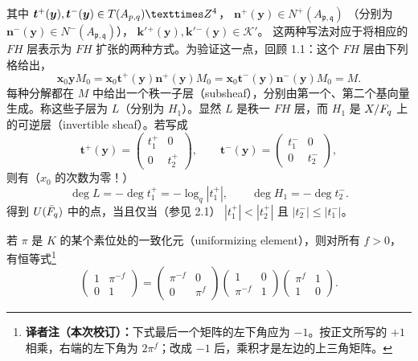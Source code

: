 其中 $\boldsymbol t^+(\boldsymbol y),\boldsymbol t^-(\boldsymbol y)\in
T(A_{\mathfrak p,\mathfrak q})\times\Z^4$，
$\boldsymbol n^+(\boldsymbol y)\in N^+(A_{\mathfrak p,\mathfrak q})$
（分别为 $\boldsymbol n^-(\boldsymbol y)\in N^-(A_{\mathfrak p,\mathfrak q})$），
$\boldsymbol k'{}^+(\boldsymbol y),\boldsymbol k'{}^-(\boldsymbol y)\in\mathcal K'$。
这两种写法对应于将相应的 $FH$ 层表示为 $FH$ 扩张的两种方式。为验证这一点，回顾 1.1：这个 $FH$ 层由下列格给出，
\[
\boldsymbol x_0\boldsymbol yM_0
=\boldsymbol x_0\boldsymbol t^+(\boldsymbol y)\boldsymbol n^+(\boldsymbol y)M_0
=\boldsymbol x_0\boldsymbol t^-(\boldsymbol y)\boldsymbol n^-(\boldsymbol y)M_0=M.
\]
每种分解都在 $M$ 中给出一个秩一子层（subsheaf），分别由第一个、第二个基向量生成。称这些子层为 $L$（分别为 $H_1$）。显然 $L$ 是秩一 $FH$ 层，而 $H_1$ 是 $X/F_q$ 上的可逆层（invertible sheaf）。若写成
\[
\boldsymbol t^+(\boldsymbol y)=\begin{pmatrix}t_1^+&0\\0&t_2^+\end{pmatrix},\qquad
\boldsymbol t^-(\boldsymbol y)=\begin{pmatrix}t_1^-&0\\0&t_2^-\end{pmatrix},
\]
则有（$x_0$ 的次数为零！）
\[
\deg L=-\deg t_1^+=-\log_q|t_1^+|,\qquad\deg H_1=-\deg t_2^-.
\]
得到 $U(\bar{F}_q)$ 中的点，当且仅当（参见 2.1）
$|t_1^+|<|t_2^+|$ 且 $|t_2^-|\leq|t_1^-|$。

若 $\pi$ 是 $K$ 的某个素位处的一致化元（uniformizing element），则对所有 $f>0$，有恒等式\footnote{\textbf{译者注（本次校订）：}下式最后一个矩阵的左下角应为 $-1$。按正文所写的 $+1$ 相乘，右端的左下角为 $2\pi^f$；改成 $-1$ 后，乘积才是左边的上三角矩阵。}
\[
\begin{pmatrix}1&\pi^{-f}\\0&1\end{pmatrix}
=\begin{pmatrix}\pi^{-f}&0\\0&\pi^f\end{pmatrix}
\begin{pmatrix}1&0\\\pi^{-f}&1\end{pmatrix}
\begin{pmatrix}\pi^f&1\\1&0\end{pmatrix}.
\]


